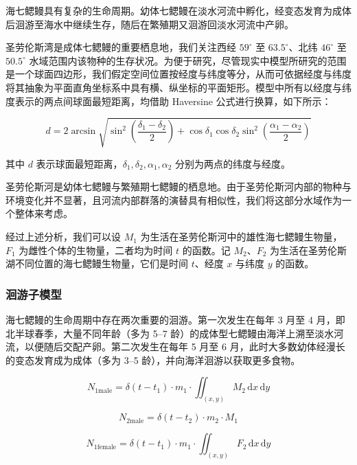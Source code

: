 \documentclass[11pt,a4paper]{ctexart}
\begin{document}
海七鳃鳗具有复杂的生命周期。幼体七鳃鳗在淡水河流中孵化，经变态发育为成体后洄游至海水中继续生存，随后在繁殖期又洄游回淡水河流中产卵。

圣劳伦斯湾是成体七鳃鳗的重要栖息地，我们关注西经 $59^\circ$ 至 $63.5^\circ$、北纬 $46^\circ$ 至 $50.5^\circ$ 水域范围内该物种的生存状况。为便于研究，尽管现实中模型所研究的范围是一个球面四边形，我们假定空间位置按经度与纬度等分，从而可依据经度与纬度将其抽象为平面直角坐标系中具有横、纵坐标的平面矩形。模型中所有以经度与纬度表示的两点间球面最短距离，均借助 Haversine 公式\cite{6}进行换算，如下所示：

\[
d = 2\arcsin\sqrt{\sin^{2}\left(\frac{\delta_1-\delta_2}{2}\right)+\cos\delta_1\cos\delta_2\sin^{2}\left(\frac{\alpha_1-\alpha_2}{2}\right)}
\]

其中 $d$ 表示球面最短距离，$\delta_1,\delta_2,\alpha_1,\alpha_2$ 分别为两点的纬度与经度。

圣劳伦斯河是幼体七鳃鳗与繁殖期七鳃鳗的栖息地。由于圣劳伦斯河内部的物种与环境变化并不显著\cite{7}，且河流内部群落的演替具有相似性，我们将这部分水域作为一个整体来考虑。

经过上述分析，我们可以设 $M_1$ 为生活在圣劳伦斯河中的雄性海七鳃鳗生物量，$F_1$ 为雌性个体的生物量，二者均为时间 $t$ 的函数。记 $M_2$、$F_2$ 为生活在圣劳伦斯湖不同位置的海七鳃鳗生物量，它们是时间 $t$、经度 $x$ 与纬度 $y$ 的函数。

\subsubsection{洄游子模型}

海七鳃鳗的生命周期中存在两次重要的洄游。第一次发生在每年 3 月至 4 月，即北半球春季，大量不同年龄（多为 5--7 龄）的成体型七鳃鳗由海洋上溯至淡水河流，以便随后交配产卵\cite{8}。第二次发生在每年 5 月至 6 月，此时大多数幼体经漫长的变态发育成为成体（多为 3--5 龄），并向海洋洄游以获取更多食物\cite{9}。

\begin{equation}
N_{1\mathrm{male}}=\delta(t-t_1)\cdot m_1\cdot\iint_{(x,y)} M_2\,\mathrm{d}x\,\mathrm{d}y
\end{equation}

\begin{equation}
N_{2\mathrm{male}}=\delta(t-t_2)\cdot m_2\cdot M_1
\end{equation}

\begin{equation}
N_{1\mathrm{female}}=\delta(t-t_1)\cdot m_1\cdot\iint_{(x,y)} F_2\,\mathrm{d}x\,\mathrm{d}y
\end{equation}
\end{document}
